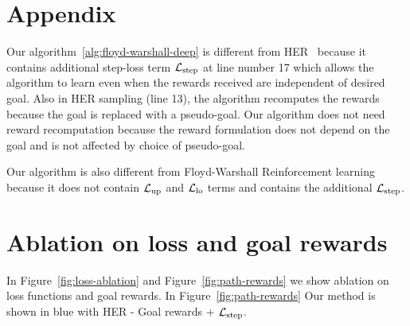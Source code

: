 \section{Appendix}

Our algorithm~\ref{alg:floyd-warshall-deep} is different from
HER~\cite{andrychowicz2016learning} because it contains additional step-loss
term $\mathcal{L}_{\text{step}}$ at line number 17 which allows the algorithm to learn even when
the rewards received are independent of desired goal. Also in HER sampling (line
13), the algorithm recomputes the rewards because the goal is replaced with a
pseudo-goal. Our algorithm does not need reward recomputation because the reward
formulation does not depend on the goal and is not affected by choice of
pseudo-goal.

Our algorithm is also different from Floyd-Warshall Reinforcement learning
because it does not contain $\mathcal{L}_{\text{up}}$ and $\mathcal{L}_{\text{lo}}$ terms and contains the
additional $\mathcal{L}_{\text{step}}$.



\section{Ablation on loss and goal rewards}

In Figure~\ref{fig:loss-ablation} and Figure~\ref{fig:path-rewards} we show
ablation on loss functions and goal rewards. In Figure~\ref{fig:path-rewards}
Our method is shown in blue with HER - Goal rewards + $\mathcal{L}_{\text{step}}$.

\begin{figure*}
\hfill

\end{figure*}